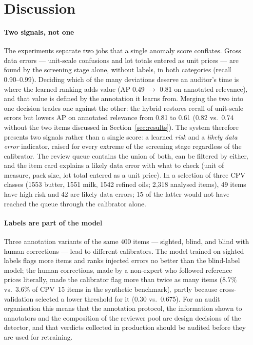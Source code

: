 \documentclass[conference]{IEEEtran}
\begin{document}
\section{Discussion}

\paragraph{Two signals, not one} The experiments separate two jobs that a single anomaly score
conflates. Gross data errors --- unit-scale confusions and lot totals entered as unit prices --- are found
by the screening stage alone, without labels, in both categories (recall 0.90--0.99). Deciding which of
the many deviations deserve an auditor's time is where the learned ranking adds value (AP 0.49 $\to$
0.81 on annotated relevance), and that value is defined by the annotation it learns from. Merging the two
into one decision trades one against the other: the hybrid restores recall of unit-scale errors but
lowers AP on annotated relevance from 0.81 to 0.61 (0.82 vs.\ 0.74 without the two items discussed in
Section~\ref{sec:results}). The system therefore presents two signals rather than a single
score: a learned \emph{risk} and a \emph{likely data error} indicator, raised for every extreme of the
screening stage regardless of the calibrator. The review queue contains the union of both, can be filtered
by either, and the item card explains a likely data error with what to check (unit of measure, pack size,
lot total entered as a unit price). In a selection of three CPV classes (1553 butter, 1551 milk, 1542 refined oils; 2{,}318 analysed
items), 49 items have high risk and 42 are likely data errors; 15 of the latter would not have reached the
queue through the calibrator alone.

\paragraph{Labels are part of the model} Three annotation variants of the same 400 items --- sighted,
blind, and blind with human corrections --- lead to different calibrators. The model trained on sighted
labels flags more items and ranks injected errors no better than the blind-label model; the human corrections,
made by a non-expert who followed reference prices literally, made the calibrator flag more than twice as
many items (8.7\% vs.\ 3.6\% of CPV~15 items in the synthetic benchmark), partly because cross-validation
selected a lower threshold for it (0.30 vs.\ 0.675). For an audit organisation this means that the annotation protocol, the information shown to
annotators and the composition of the reviewer pool are design decisions of the detector, and that
verdicts collected in production should be audited before they are used for retraining.
\end{document}
